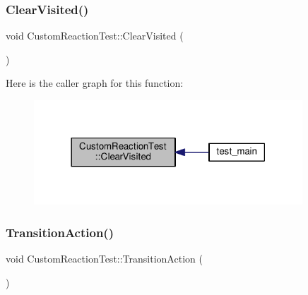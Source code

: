 \subsubsection{\texorpdfstring{Clear\+Visited()}{ClearVisited()}}
{\footnotesize\ttfamily void Custom\+Reaction\+Test\+::\+Clear\+Visited (\begin{DoxyParamCaption}{ }\end{DoxyParamCaption})\hspace{0.3cm}{\ttfamily [inline]}}

Here is the caller graph for this function\+:
\nopagebreak
\begin{figure}[H]
\begin{center}
\leavevmode
\includegraphics[width=285pt]{struct_custom_reaction_test_a709bb7b5b76023d92a3438eca445d37b_icgraph}
\end{center}
\end{figure}
\mbox{\label{struct_custom_reaction_test_ac5e80e655da98aec51957072fa2d74bc}} 
\subsubsection{\texorpdfstring{Transition\+Action()}{TransitionAction()}}
{\footnotesize\ttfamily void Custom\+Reaction\+Test\+::\+Transition\+Action (\begin{DoxyParamCaption}\item[{const \mbox{\hyperlink{struct_ev_transit_with_action}{Ev\+Transit\+With\+Action}} \&}]{ }\end{DoxyParamCaption})\hspace{0.3cm}{\ttfamily [inline]}}

